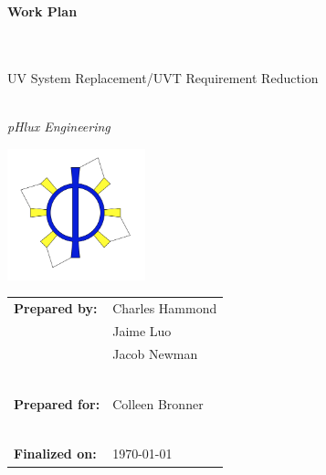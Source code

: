 \documentclass[11pt,letterpaper,final]{report}
\author{Charles Hammond \\ Jaime Luo \\ Jacob Newman}
\begin{document}
\begin{center}

\begin{huge} 

\begin{Huge}\textbf{Work Plan} \end{Huge} \\~\\  UV System Replacement/UVT Requirement Reduction \\~\\
\end{huge}


\begin{Large} \textit{pHlux Engineering} \end{Large}



\begin{large}

\vspace{100pt}
\includegraphics[height=1.5in]{wp1}\\
\end{large}

\vspace{100pt}


\begin{tabular}{ll}
    \textbf{Prepared by:}&Charles Hammond\\
                         & Jaime Luo\\
                         & Jacob Newman\\
                         & \\~\\
    \textbf{Prepared for:}& Colleen Bronner\\
                         & \\~\\
    \textbf{Finalized on:}& \today\\ 

\end{tabular}

\end{center}

\end{document}

